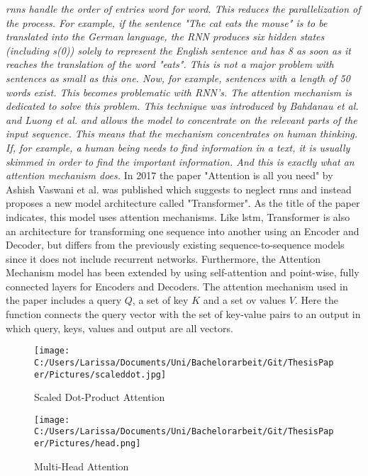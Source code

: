 \documentclass[a4paper, 11pt,titlepage,oneside,openany]{book}
\begin{document}
\textit{\noindent \gls{rnn}s handle the order of entries word for word. This reduces the parallelization of the process. For example, if the sentence "The cat eats the mouse" is to be translated into the German language, the RNN produces six hidden states (including s(0)) solely to represent the English sentence and has 8 as soon as it reaches the translation of the word "eats". This is not a major problem with sentences as small as this one. Now, for example, sentences with a length of 50 words exist. This becomes problematic with RNN's. The attention mechanism is dedicated to solve this problem. This technique was introduced by Bahdanau et al. \cite{bahdnau} and Luong et al. \cite{lunong} and allows the model to concentrate on the relevant parts of the input sequence. This means that the mechanism concentrates on human thinking. If, for example, a human being needs to find information in a text, it is usually skimmed in order to find the important information. And this is exactly what an attention mechanism does. }
\newpage
In 2017 the paper "Attention is all you need" by Ashish Vaswani et al.  \cite{attention} was published which suggests to neglect \gls{rnn}s and instead proposes a new model architecture called "Transformer". As the title of the paper indicates, this model uses attention mechanisms. Like \gls{lstm}, Transformer is also an architecture for transforming one sequence into another using an Encoder and Decoder, but differs from the previously existing sequence-to-sequence models since it does not include recurrent networks. Furthermore, the Attention Mechanism model has been extended by using self-attention and point-wise, fully connected layers for Encoders and Decoders.
The attention mechanism used in the paper includes a query $Q$, a set of key $K$ and a set ov values $V$. Here the function connects the query vector with the set of key-value pairs to an output in which query, keys, values and output are all vectors.\\
\begin{figure}[t]
	\begin{minipage}[b]{0.5\linewidth}
		\texttt{[image: C:/Users/Larissa/Documents/Uni/Bachelorarbeit/Git/ThesisPaper/Pictures/scaleddot.jpg]}
		\caption{Scaled Dot-Product Attention}
	\end{minipage}
	\hfill
	\begin{minipage}[b]{0.5\linewidth}
		\texttt{[image: C:/Users/Larissa/Documents/Uni/Bachelorarbeit/Git/ThesisPaper/Pictures/head.png]}
		\caption{Multi-Head Attention}
	\end{minipage}
\end{figure}
\end{document}
